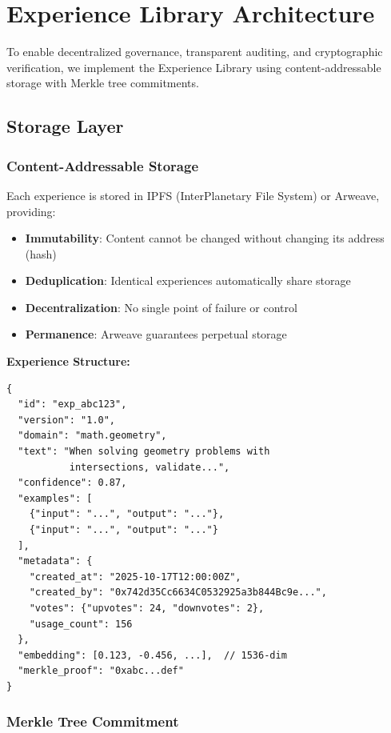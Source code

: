 \section{Experience Library Architecture}

\label{sec:architecture}

To enable decentralized governance, transparent auditing, and cryptographic verification, we implement the Experience Library using content-addressable storage with Merkle tree commitments.

\subsection{Storage Layer}

\subsubsection{Content-Addressable Storage}

Each experience is stored in IPFS (InterPlanetary File System) or Arweave, providing:
\begin{itemize}
    \item \textbf{Immutability}: Content cannot be changed without changing its address (hash)
    \item \textbf{Deduplication}: Identical experiences automatically share storage
    \item \textbf{Decentralization}: No single point of failure or control
    \item \textbf{Permanence}: Arweave guarantees perpetual storage
\end{itemize}

\textbf{Experience Structure:}
\begin{verbatim}
{
  "id": "exp_abc123",
  "version": "1.0",
  "domain": "math.geometry",
  "text": "When solving geometry problems with
           intersections, validate...",
  "confidence": 0.87,
  "examples": [
    {"input": "...", "output": "..."},
    {"input": "...", "output": "..."}
  ],
  "metadata": {
    "created_at": "2025-10-17T12:00:00Z",
    "created_by": "0x742d35Cc6634C0532925a3b844Bc9e...",
    "votes": {"upvotes": 24, "downvotes": 2},
    "usage_count": 156
  },
  "embedding": [0.123, -0.456, ...],  // 1536-dim
  "merkle_proof": "0xabc...def"
}
\end{verbatim}

\subsubsection{Merkle Tree Commitment}

